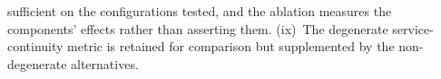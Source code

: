 \documentclass[conference]{IEEEtran}
\begin{document}
sufficient on the configurations tested, and the ablation measures the components' effects rather than asserting them. (ix)~The degenerate service-continuity metric is retained for comparison but supplemented by the non-degenerate alternatives.


\balance
\renewcommand{\IEEEbibitemsep}{0pt}
\end{document}
